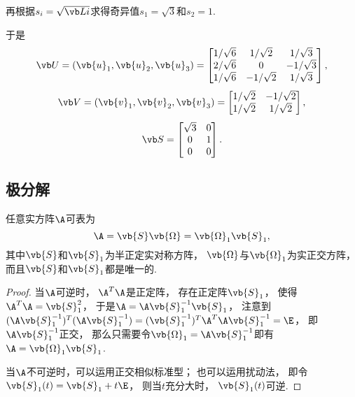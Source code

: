 \begin{example}
\begin{solution}
再根据\(s_i = \sqrt{\L{i}}\)求得奇异值\(s_1 = \sqrt{3}\)和\(s_2 = 1\).

于是\[
	\U = (\vb{u}_1,\vb{u}_2,\vb{u}_3)
	= \begin{bmatrix}
		1/\sqrt{6} & 1/\sqrt{2} & 1/\sqrt{3} \\
		2/\sqrt{6} & 0 & -1/\sqrt{3} \\
		1/\sqrt{6} & -1/\sqrt{2} & 1/\sqrt{3}
	\end{bmatrix},
\]\[
	\V = (\vb{v}_1,\vb{v}_2,\vb{v}_3)
	= \begin{bmatrix}
		1/\sqrt{2} & -1/\sqrt{2} \\
		1/\sqrt{2} & 1/\sqrt{2}
	\end{bmatrix},
\]\[
	\S = \begin{bmatrix}
		\sqrt{3} & 0 \\
		0 & 1 \\
		0 & 0
	\end{bmatrix}.
\]
\end{solution}
\end{example}

\subsection{极分解}
\begin{theorem}
\def\S{\vb{S}}
\def\M{\vb{\Omega}}
任意实方阵\(\A\)可表为\[
	\A = \S\M = \M_1 \S_1,
\]
其中\(\S\)和\(\S_1\)为半正定实对称方阵，
\(\M\)与\(\M_1\)为实正交方阵，
而且\(\S\)和\(\S_1\)都是唯一的.
\begin{proof}
当\(\A\)可逆时，
\(\A^T \A\)是正定阵，
存在正定阵\(\S_1\)，
使得\(\A^T \A = \S_1^2\)，
于是\(\A = \A \S_1^{-1} \S_1\)，
注意到\((\A \S_1^{-1})^T (\A \S_1^{-1}) = (\S_1^{-1})^T \A^T \A \S_1^{-1} = \E\)，
即\(\A \S_1^{-1}\)正交，
那么只需要令\(\M_1 = \A \S_1^{-1}\)即有\(\A = \M_1 \S_1\).

当\(\A\)不可逆时，可以运用正交相似标准型；
也可以运用扰动法，
即令\(\S_1(t) = \S_1 + t\E\)，
则当\(t\)充分大时，
\(\S_1(t)\)可逆.
\end{proof}
\end{theorem}


